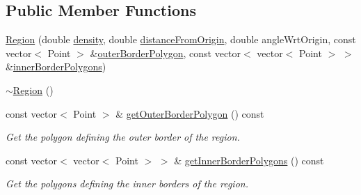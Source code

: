 \subsection*{Public Member Functions}
\begin{DoxyCompactItemize}
\item 
\hyperlink{classmultiscale_1_1analysis_1_1Region_a00d2d1abf4b96957679272983f4f8f23}{Region} (double \hyperlink{classmultiscale_1_1analysis_1_1SpatialEntityPseudo3D_aedf807816f8c2f7cd961acfe0042fc56}{density}, double \hyperlink{classmultiscale_1_1analysis_1_1SpatialEntityPseudo3D_a056f67b90ed41c0e6dc4df31b71ad906}{distance\-From\-Origin}, double angle\-Wrt\-Origin, const vector$<$ Point $>$ \&\hyperlink{classmultiscale_1_1analysis_1_1Region_a5cf5012f0f248cc7135f04c049365fb8}{outer\-Border\-Polygon}, const vector$<$ vector$<$ Point $>$ $>$ \&\hyperlink{classmultiscale_1_1analysis_1_1Region_adf9ce65ec31dae1083adbfed3a8f69e1}{inner\-Border\-Polygons})
\item 
\hyperlink{classmultiscale_1_1analysis_1_1Region_a3c3670fff78f7511d156e3b2f0bc6266}{$\sim$\-Region} ()
\item 
const vector$<$ Point $>$ \& \hyperlink{classmultiscale_1_1analysis_1_1Region_a749ba3b53646bffcea3b871ed19d2f0a}{get\-Outer\-Border\-Polygon} () const 
\begin{DoxyCompactList}\small\item\em Get the polygon defining the outer border of the region. \end{DoxyCompactList}\item 
const vector$<$ vector$<$ Point $>$ $>$ \& \hyperlink{classmultiscale_1_1analysis_1_1Region_a196d4974dd7a5d947d916cd8743d3e97}{get\-Inner\-Border\-Polygons} () const 
\begin{DoxyCompactList}\small\item\em Get the polygons defining the inner borders of the region. \end{DoxyCompactList}\end{DoxyCompactItemize}
